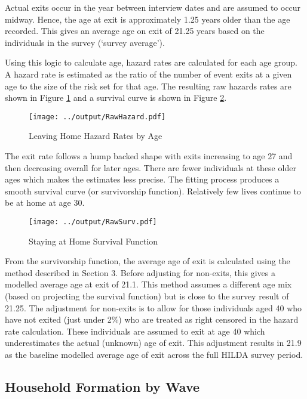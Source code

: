 \documentclass[12pt]{article}
\begin{document}
Actual exits occur in the year between interview dates and are assumed to occur midway. Hence, the age at exit is approximately 1.25 years older than the age recorded. This gives an average age on exit of 21.25 years based on the individuals in the survey (`survey average').

Using this logic to calculate age, hazard rates are calculated for each age group. A hazard rate is estimated as the ratio of the number of event exits at a given age to the size of the risk set for that age. The resulting raw hazards rates are shown in Figure \ref{ExitbyAge} and a survival curve is shown in Figure \ref{StaybyAge}.

\begin{figure}[htpb]
  \caption{Leaving Home Hazard Rates by Age}
  \label{ExitbyAge}
  \centering
  \texttt{[image: ../output/RawHazard.pdf]}
\end{figure}

The exit rate follows a hump backed shape with exits increasing to age 27 and then decreasing overall for later ages. There are fewer individuals at these older ages which makes the estimates less precise. The fitting process produces a smooth survival curve (or survivorship function). Relatively few lives continue to be at home at age 30.

\begin{figure}[htpb]
  \caption{Staying at Home Survival Function}
  \label{StaybyAge}
  \centering
  \texttt{[image: ../output/RawSurv.pdf]}
\end{figure}

From the survivorship function, the average age of exit is calculated using the method described in Section 3. Before adjusting for non-exits, this gives a modelled average age at exit of 21.1. This method assumes a different age mix (based on projecting the survival function) but is close to the survey result of 21.25. The adjustment for non-exits is to allow for those individuals aged 40 who have not exited (just under 2\%) who are treated as right censored in the hazard rate calculation. These individuals are assumed to exit at age 40 which underestimates the actual (unknown) age of exit. This adjustment results in 21.9 as the baseline modelled average age of exit across the full HILDA survey period.

\subsection{Household Formation by Wave}
\end{document}
